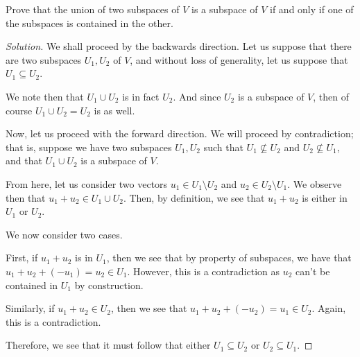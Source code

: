 \documentclass[openany]{book}
\newenvironment{solution}{\begin{proof}[Solution]}{\end{proof}}
\begin{document}
	\begin{hw}
		Prove that the union of two subspaces of $V$ is a subspace of $V$ if and only if one of the subspaces is contained in the other.
	\end{hw}
	\begin{solution}
		We shall proceed by the backwards direction. Let us suppose that there are two subspaces $U_{1}, U_{2}$ of $V$, and without loss of generality, let us suppose that $U_{1} \subseteq U_{2}$.
		
		We note then that $U_{1} \cup U_{2}$ is in fact $U_{2}$. And since $U_{2}$ is a subspace of $V$, then of course $U_{1} \cup U_{2} = U_{2}$ is as well.
		
		Now, let us proceed with the forward direction. We will proceed by contradiction; that is, suppose we have two subspaces $U_{1}, U_{2}$ such that $U_{1} \not\subseteq U_{2}$ and $U_{2} \not\subseteq U_{1}$, and that $U_{1} \cup U_{2}$ is a subspace of $V$.
		
		From here, let us consider two vectors $u_{1} \in U_{1} \setminus U_{2}$ and $u_{2} \in U_{2} \setminus U_{1}$. We observe then that $u_{1} + u_{2} \in U_{1} \cup U_{2}$. Then, by definition, we see that $u_{1} + u_{2}$ is either in $U_{1}$ or $U_{2}$.
		
		We now consider two cases.
		
		First, if $u_{1} + u_{2}$ is in $U_{1}$, then we see that by property of subspaces, we have that $u_{1} + u_{2} + (-u_{1}) = u_{2} \in U_{1}$. However, this is a contradiction as $u_{2}$ can't be contained in $U_{1}$ by construction.
		
		Similarly, if $u_{1} + u_{2} \in U_{2}$, then we see that $u_{1} + u_{2} + (-u_{2}) = u_{1} \in U_{2}$. Again, this is a contradiction.
		
		Therefore, we see that it must follow that either $U_{1} \subseteq U_{2}$ or $U_{2} \subseteq U_{1}$.
	\end{solution}
	
\end{document}
